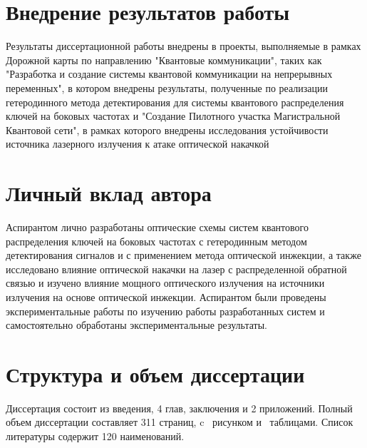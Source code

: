 \section*{Внедрение результатов работы}
Результаты диссертационной работы внедрены в проекты, выполняемые в рамках Дорожной карты по направлению "Квантовые коммуникации", таких как  "Разработка и создание системы квантовой коммуникации на непрерывных переменных", в котором внедрены результаты, полученные по реализации гетеродинного метода детектирования для системы квантового распределения ключей на боковых частотах  и "Создание Пилотного участка Магистральной Квантовой сети", в рамках которого внедрены исследования устойчивости источника лазерного излучения к атаке оптической накачкой


\section*{Личный вклад автора}
Аспирантом лично разработаны оптические схемы систем квантового распределения ключей на боковых частотах с гетеродинным методом детектирования сигналов и с применением метода оптической инжекции, а также исследовано влияние оптической накачки на лазер с распределенной обратной связью и изучено влияние мощного оптического излучения на источники излучения на основе оптической инжекции. Аспирантом были проведены экспериментальные работы по изучению работы разработанных систем и самостоятельно обработаны экспериментальные результаты.
\section*{Структура и объем диссертации} Диссертация состоит из введения, 4 глав, заключения и 2 приложений. Полный объем диссертации составляет 311 страниц, c  \totalfigures\ рисунком  и \totaltables\ таблицами. Список литературы содержит 120 наименований.
